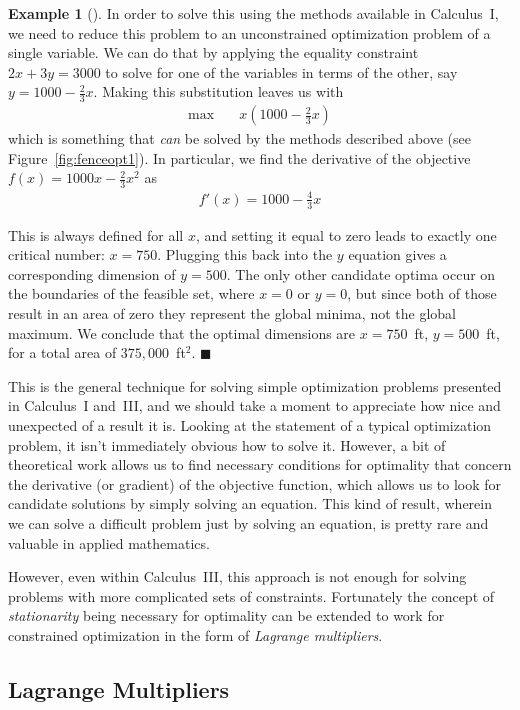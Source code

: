 \documentclass[11pt]{article}
\theoremstyle{definition} %
\newtheorem{ex}{Example}[section] %
\newenvironment{example}[1][]{\begin{ex}[#1]}{\hfill$\blacksquare$\end{ex}} %
\begin{document}
\begin{example}
	In order to solve this using the methods available in Calculus~I, we need to reduce this problem to an unconstrained optimization problem of a single variable. We can do that by applying the equality constraint $2x + 3y = 3000$ to solve for one of the variables in terms of the other, say $y = 1000 - \frac{2}{3} x$. Making this substitution leaves us with
	\begin{align*}
		\max \quad& x \left( 1000 - \frac{2}{3} x \right)
	\end{align*}
	which is something that \textit{can} be solved by the methods described above (see Figure~\ref{fig:fenceopt1}). In particular, we find the derivative of the objective $f(x) = 1000x - \frac{2}{3} x^2$ as
	\begin{align*}
		f'(x) = 1000 - \frac{4}{3} x
	\end{align*}
	
	This is always defined for all $x$, and setting it equal to zero leads to exactly one critical number: $x = 750$. Plugging this back into the $y$ equation gives a corresponding dimension of $y = 500$. The only other candidate optima occur on the boundaries of the feasible set, where $x = 0$ or $y = 0$, but since both of those result in an area of zero they represent the global minima, not the global maximum. We conclude that the optimal dimensions are $x = 750$~ft, $y = 500$~ft, for a total area of $375,\!000$~ft$^2$.
\end{example}

This is the general technique for solving simple optimization problems presented in Calculus~I and~III, and we should take a moment to appreciate how nice and unexpected of a result it is. Looking at the statement of a typical optimization problem, it isn't immediately obvious how to solve it. However, a bit of theoretical work allows us to find necessary conditions for optimality that concern the derivative (or gradient) of the objective function, which allows us to look for candidate solutions by simply solving an equation. This kind of result, wherein we can solve a difficult problem just by solving an equation, is pretty rare and valuable in applied mathematics.

However, even within Calculus~III, this approach is not enough for solving problems with more complicated sets of constraints. Fortunately the concept of \textit{stationarity} being necessary for optimality can be extended to work for constrained optimization in the form of \textit{Lagrange multipliers}.

\subsection{Lagrange Multipliers}
\label{subsec:lagrange}
\end{document}
